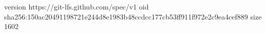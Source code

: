 version https://git-lfs.github.com/spec/v1
oid sha256:150ac20491198721e244d8e1983b48ccdcc177cb53ff911f972e2c9ea4cef889
size 1602
